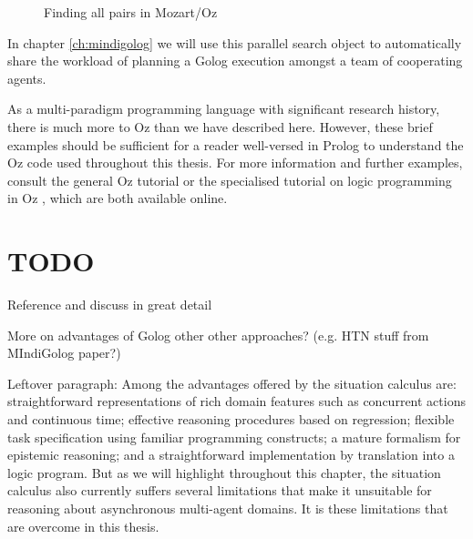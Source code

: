 %
\begin{figure}[t]

\caption{Finding all pairs in Mozart/Oz\label{fig:Background:Parallel-All-Pairs}}

\end{figure}


In chapter \ref{ch:mindigolog} we will use this parallel search object
to automatically share the workload of planning a Golog execution
amongst a team of cooperating agents.

As a multi-paradigm programming language with significant research
history, there is much more to Oz than we have described here. However,
these brief examples should be sufficient for a reader well-versed
in Prolog to understand the Oz code used throughout this thesis. For
more information and further examples, consult the general Oz tutorial
\citep{haridi99oz_tutorial} or the specialised tutorial on logic
programming in Oz \citep{lpinoz99}, which are both available online.


\section{TODO}

Reference and discuss \citep{pinto98sc_observations} in great detail

More on advantages of Golog other other approaches? (e.g. HTN stuff
from MIndiGolog paper?)

Leftover paragraph: Among the advantages offered by the situation
calculus are: straightforward representations of rich domain features
such as concurrent actions and continuous time; effective reasoning
procedures based on regression; flexible task specification using
familiar programming constructs; a mature formalism for epistemic
reasoning; and a straightforward implementation by translation into
a logic program. But as we will highlight throughout this chapter,
the situation calculus also currently suffers several limitations
that make it unsuitable for reasoning about asynchronous multi-agent
domains. It is these limitations that are overcome in this thesis.


